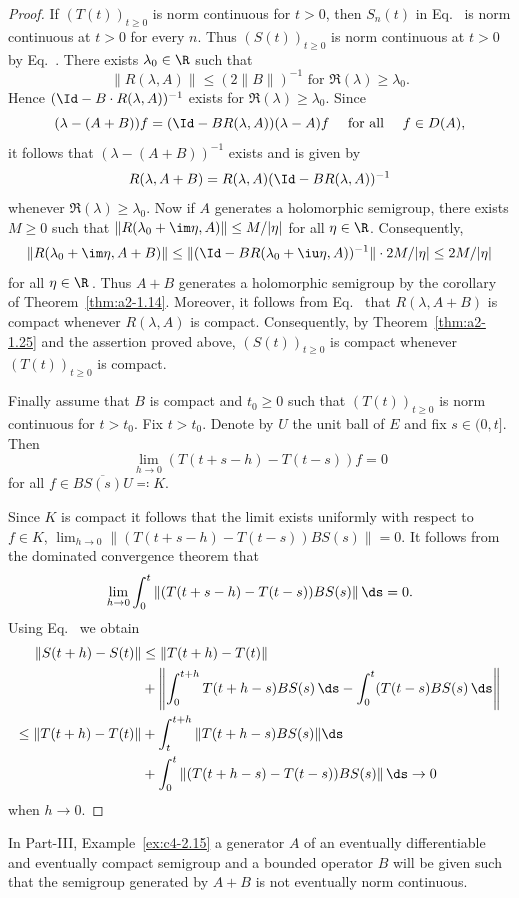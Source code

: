 \begin{proof}
If\/ $(T(t))_{t \geq 0}$ is norm continuous for $t > 0$, then $S_{n}(t)$ in Eq.~ is norm continuous at $t > 0$ for every $n$.
Thus $(S(t))_{t \geq 0}$ is norm continuous at $t > 0$ by Eq.~.
There exists $\lambda_{0} \in \R$ such that 
%
\[
	\|R(\lambda,A)\| \leq (2\|B\|)^{-1} \text{ for } \Re(\lambda) \geq \lambda_{0} .
\]
%
Hence $(\Id - B \cdot R(\lambda,A))^{-1}$ exists for $\Re(\lambda) \geq \lambda_{0}$.
Since 
\[
(\lambda -(A+B))f = (\Id - BR(\lambda,A))(\lambda - A)f  \quad \text{ for all } \quad f \in D(A),
\]
it follows that $(\lambda-(A+B))^{-1}$ exists and is given by
\begin{equation}\label{eq:a2-1.12}
    R(\lambda,A+B) = R(\lambda,A)(\Id-BR(\lambda,A))^{-1}
\end{equation}
whenever $\Re(\lambda) \geq \lambda_{0}$.
Now if\/ $A$ generates a holomorphic semigroup, there exists $M \geq 0$ such that $\|R(\lambda_{0}+\im\eta,A)\| \leq M/|\eta|$ for all $\eta \in \R$.
Consequently, 
\[
\|R(\lambda_{0}+\im\eta,A+B)\| \leq \|(\Id-BR(\lambda_{0} + \iu \eta,A))^{-1}\| \cdot 2M/|\eta| \leq 2M/|\eta|
\]
for all $\eta \in \R$\,.
Thus $A + B$ generates a holomorphic semigroup by the corollary of Theorem~\ref{thm:a2-1.14}.
Moreover, it follows from Eq.~  that $R(\lambda,A+B)$ is compact whenever $R(\lambda,A)$  is compact.
Consequently, by Theorem~\ref{thm:a2-1.25} and the  assertion proved above, $(S(t))_{t \geq 0}$ is compact whenever $(T(t))_{t \geq 0}$ is compact.

Finally assume that $B$ is compact and $t_{0} \geq 0$ such that $(T(t))_{t \geq 0}$ 
is norm continuous for $t > t_{0}$.
Fix $t > t_{0}$.
Denote by $U$ the unit ball of\/ $E$ and fix $s \in (0,t]$.
Then
\[
    \lim_{h \to 0} (T(t+s-h) - T(t-s))f = 0
\]
for all $f \in \overline{BS(s)U} \eqqcolon K$.

Since $K$ is compact it follows that the limit exists uniformly with respect to $f \in K$, \ie  
$\lim_{h \to 0} \|(T(t+s-h) - T(t-s))BS(s)\| = 0$.
It follows from the dominated convergence theorem that
\begin{equation}\label{eq:a2-1.13}
    \lim_{h \to 0} \int_{0}^{t} \|(T(t+s-h) - T(t-s))BS(s)\|\, \ds = 0.
\end{equation}
Using  Eq.~  we obtain 
\begin{align*}
	\|S(t+h) - S(t)\| &\leq \|T(t+h) - T(t)\|   \\
	&+  \left\| \int_{0}^{t+h} T(t+h-s)BS(s)\, \ds 
	-  \int_{0}^{t} (T(t-s)BS(s)\, \ds \right\|  \\
	\leq \|T(t+h) - T(t)\| &+ \int_{t}^{t+h} \|T(t+h-s)BS(s)\| \ds    \\ 
	&+ \int_{0}^{t} \|(T(t+h-s) - T(t-s))BS(s)\|\, \ds \to 0 
\end{align*}
when  $h \to 0$. 	
\end{proof}
In Part-III, Example~\ref{ex:c4-2.15} a generator $A$ of an eventually differentiable and eventually compact semigroup and a bounded operator $B$ will be given such that the semigroup generated by $A+B$ is not eventually norm continuous.

